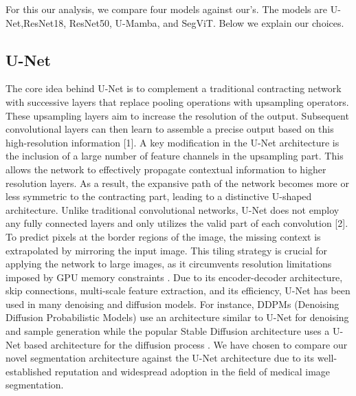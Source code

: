 \documentclass[conference]{IEEEtran}
\begin{document}
For this our analysis, we compare four models against our's. The models are U-Net\cite{ronneberger2015unet},ResNet18, ResNet50, U-Mamba\cite{U-Mamba}, and SegViT\cite{dosovitskiy2021image}. Below we explain our choices.
\subsection{U-Net}
 The core idea behind U-Net is to complement a traditional contracting network with successive layers that replace pooling operations with upsampling operators. These upsampling layers aim to increase the resolution of the output. Subsequent convolutional layers can then learn to assemble a precise output based on this high-resolution information [1]. 
 A key modification in the U-Net architecture is the inclusion of a large number of feature channels in the upsampling part. This allows the network to effectively propagate contextual information to higher resolution layers. As a result, the expansive path of the network becomes more or less symmetric to the contracting part, leading to a distinctive U-shaped architecture. Unlike traditional convolutional networks, U-Net does not employ any fully connected layers and only utilizes the valid part of each convolution [2]. To predict pixels at the border regions of the image, the missing context is extrapolated by mirroring the input image. This tiling strategy is crucial for applying the network to large images, as it circumvents resolution limitations imposed by GPU memory constraints \cite{ronneberger2015unet}. Due to its encoder-decoder architecture, skip connections, multi-scale feature extraction, and its efficiency, U-Net has been used in many denoising and diffusion models. For instance, DDPMs (Denoising Diffusion Probabilistic Models) use an architecture similar to U-Net for denoising and sample generation \cite{DBLP:journals/corr/abs-2006-11239} while the popular Stable Diffusion architecture uses a U-Net based architecture for the diffusion process \cite{rombach2021highresolution}. We have chosen to compare our novel segmentation architecture against the U-Net architecture due to its well-established reputation and widespread adoption in the field of medical image segmentation.
 
\end{document}
